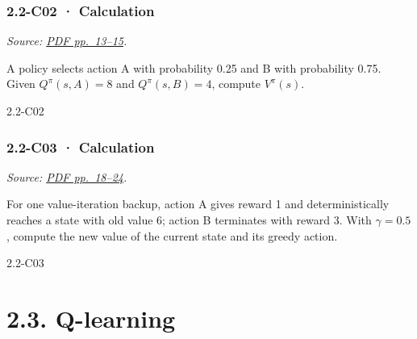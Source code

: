 \noindent\begin{minipage}{\linewidth}

\subsubsection{2.2-C02 · Calculation}\label{c02-calculation-4}

\emph{Source:
\href{../Lecture\%20Slides/2.2.\%20Markov\%20decision\%20processes.pdf\#page=13}{PDF
pp.~13--15}.}

A policy selects action A with probability 0.25 and B with probability
0.75. Given \(Q^\pi(s,A)=8\) and \(Q^\pi(s,B)=4\), compute \(V^\pi(s)\).

\begin{solution}[26mm]{2.2-C02}

\end{solution}
\end{minipage}\par\medskip

\noindent\begin{minipage}{\linewidth}

\subsubsection{2.2-C03 · Calculation}\label{c03-calculation-4}

\emph{Source:
\href{../Lecture\%20Slides/2.2.\%20Markov\%20decision\%20processes.pdf\#page=18}{PDF
pp.~18--24}.}

For one value-iteration backup, action A gives reward 1 and
deterministically reaches a state with old value 6; action B terminates
with reward 3. With \(\gamma=0.5\), compute the new value of the current
state and its greedy action.

\begin{solution}[26mm]{2.2-C03}

\end{solution}
\end{minipage}\par\medskip

\clearpage

\section{2.3. Q-learning}\label{q-learning}

